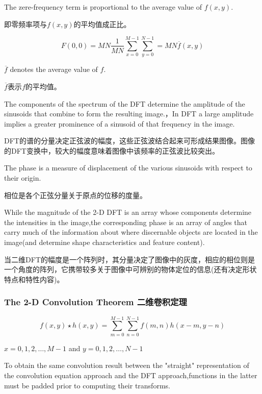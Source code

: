 \documentclass[12pt]{article}
\numberwithin{equation}{section}%
\begin{document}
The zere-frequency term is proportional to the average value of $f(x,y)$.

即零频率项与$f(x,y)$的平均值成正比。

\begin{equation} \label{4.41}
F(0,0)=MN\frac{1}{MN}\sum_{x=0}^{M-1}\sum_{y=0}^{N-1}=MN\overline{f}(x,y)
\end{equation} 

$\overline{f}$ denotes the average value of $f$.

$\overline{f}$表示$f$的平均值。

The components of the spectrum of the DFT determine the amplitude of the sinusoids that combine to form the resulting image.，In DFT a large amplitude implies a greater prominence of a sinusoid of that frequency in the image.

DFT的谱的分量决定正弦波的幅度，这些正弦波结合起来可形成结果图像。图像的DFT变换中，较大的幅度意味着图像中该频率的正弦波比较突出。

The phase is a measure of displacement of the various sinusoids with respect to their origin.

相位是各个正弦分量关于原点的位移的度量。

While the magnitude of the 2-D DFT is an array whose components determine the intensities in the image,the corresponding phase is an array of angles that carry much of the information about where discernable objects are located in the image(and determine shape characteristics and feature content).

当二维DFT的幅度是一个阵列时，其分量决定了图像中的灰度，相应的相位则是一个角度的阵列，它携带较多关于图像中可辨别的物体定位的信息(还有决定形状特点和特性内容)。 

\subsubsection{The 2-D Convolution Theorem 二维卷积定理}

\begin{equation} \label{4.42}
f(x,y)\star h(x,y)=\sum_{m=0}^{M-1}\sum_{n=0}^{N-1}f(m,n)h(x-m,y-n)
\end{equation} 

$x=0,1,2,\ldots,M-1$ and $y=0,1,2,\ldots,N-1$

To obtain the same convolution result between the "straight" representation of the convolution equation approach and the DFT approach,functions in the latter must be padded prior to computing their transforms.
\end{document}
